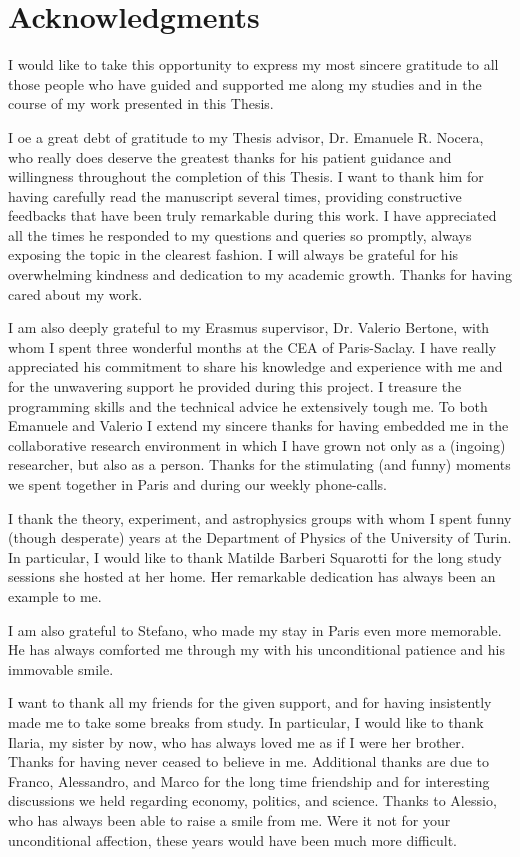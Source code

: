 \chapter*{Acknowledgments}
%
I would like to take this opportunity to express my most sincere gratitude to all those people who have guided and supported me along my studies and in the course of my work presented in this Thesis.\medbreak

\noindent I oe a great debt of gratitude to my Thesis advisor, Dr. Emanuele R. Nocera, who really does deserve the greatest thanks for his patient guidance and willingness throughout the completion of this Thesis. I want to thank him for having carefully read the manuscript several times, providing constructive feedbacks that have been truly remarkable during this work. I have appreciated all the times he responded to my questions and queries so promptly, always exposing the topic in the clearest fashion. I will always be grateful for his overwhelming kindness and dedication to my academic growth. Thanks for having cared about my work.  
\medbreak

\noindent I am also deeply grateful to my Erasmus supervisor, Dr. Valerio Bertone, with whom I spent three wonderful months at the CEA of Paris-Saclay. I have really appreciated his commitment to share his knowledge and experience with me and for the unwavering support he provided during this project. I treasure the programming skills and the technical advice he extensively tough me. To both Emanuele and Valerio I extend my sincere thanks for having embedded me in the collaborative research environment in which I have grown not only as a (ingoing) researcher, but also as a person. Thanks for the stimulating (and funny) moments we spent together in Paris and during our weekly phone-calls.\medbreak

\noindent I thank the theory, experiment, and astrophysics groups with whom I spent funny (though desperate) years at the Department of Physics of the University of Turin. In particular, I would like to thank Matilde Barberi Squarotti for the long study sessions she hosted at her home. Her remarkable dedication has always been an example to me.\medbreak

\noindent I am also grateful to Stefano, who made my stay in Paris even more memorable. He has always comforted me through my  with his unconditional patience and his immovable smile.\medbreak

\noindent I want to thank all my friends for the given support, and for having insistently made me to take some breaks from study. In particular, I would like to thank Ilaria, my sister by now, who has always loved me as if I were her brother. Thanks for having never ceased to believe in me. Additional thanks are due to Franco, Alessandro, and Marco for the long time friendship and for interesting discussions we held regarding economy, politics, and science. Thanks to Alessio, who has always been able to raise a smile from me. Were it not for your unconditional affection, these years would have been much more difficult.\medbreak

